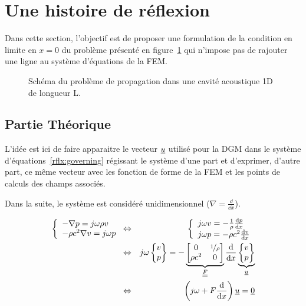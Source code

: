 \section{Une histoire de réflexion}

Dans cette section, l'objectif est de proposer une formulation de la condition en limite en $x=0$ du problème présenté
en figure~\ref{fig:rflx:propa_1D} qui n'impose pas de rajouter une ligne au système d'équations de la FEM.

\begin{figure}[!ht]
	\centering
	
	\caption{\label{fig:rflx:propa_1D}Schéma du problème de propagation dans une cavité acoustique 1D de longueur L.}
\end{figure}

\subsection{Partie Théorique}

L'idée est ici de faire apparaitre le vecteur $\underline{u}$ utilisé pour la DGM dans le système
d'équations~\eqref{rflx:governing} régissant le système d'une part et d'exprimer, d'autre part, ce même vecteur avec les
fonction de forme de la FEM et les points de calculs des champs associés.

Dans la suite, le système est considéré unidimensionnel ($\nabla = \frac{\dd}{\dd x}$).

\begin{eqnarray}
	\left\{\begin{array}{l}
		-\nabla p = j\omega\rho v\\
		-\rho c^2\nabla v = j\omega p
	\end{array}\right.
	& \Leftrightarrow &
	\left\{\begin{array}{l}
		j\omega v = -\frac{1}{\rho}\frac{\mathrm{d} p}{\mathrm{d} x}\\
		j\omega p = -\rho c^2\frac{\mathrm{d} v}{\mathrm{d} x}
	\end{array}\right.\label{rflx:governing}\\
	& \Leftrightarrow &
j\omega \begin{Bmatrix}v\\p\end{Bmatrix} = -\underbrace{\begin{bmatrix}0 & \nicefrac{1}{\rho}\\\rho c^2 & 0
\end{bmatrix}}_{\underline{\underline{F}}}\frac{\mathrm{d}}{\mathrm{d} x}\underbrace{\begin{Bmatrix}v\\p\end{Bmatrix}}_{\underline{u}}\notag\\
	& \Leftrightarrow & \left(j\omega + F\frac{\mathrm{d}}{\mathrm{d} x}\right)\underline{u} = \underline{0} \label{rflx:gov_vect}
\end{eqnarray}

